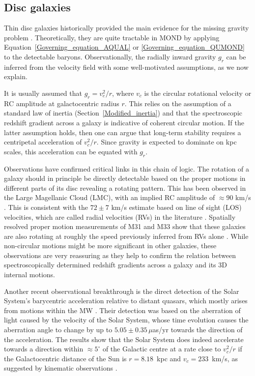 \documentclass[fleqn,usenatbib,useAMS,onecolumn]{mnras} %
\begin{document}
\subsection{Disc galaxies}
\label{Disc_galaxies}

Thin disc galaxies historically provided the main evidence for the missing gravity problem \citep[as reviewed in][]{Faber_1979}. Theoretically, they are quite tractable in MOND by applying Equation~\ref{Governing_equation_AQUAL} or \ref{Governing_equation_QUMOND} to the detectable baryons. Observationally, the radially inward gravity $g_r$ can be inferred from the velocity field with some well-motivated assumptions, as we now explain.

It is usually assumed that $g_r = v_c^2/r$, where $v_c$ is the circular rotational velocity or RC amplitude at galactocentric radius $r$. This relies on the assumption of a standard law of inertia (Section~\ref{Modified_inertia}) and that the spectroscopic redshift gradient across a galaxy is indicative of coherent circular motion. If the latter assumption holds, then one can argue that long-term stability requires a centripetal acceleration of $v_c^2/r$. Since gravity is expected to dominate on kpc scales, this acceleration can be equated with $g_r$.

Observations have confirmed critical links in this chain of logic. The rotation of a galaxy should in principle be directly detectable based on the proper motions in different parts of its disc revealing a rotating pattern. This has been observed in the Large Magellanic Cloud (LMC), with an implied RC amplitude of $\approx 90$ km/s \citep{Van_der_Marel_2014, Van_der_Marel_2016, Vasiliev_2018}. This is consistent with the $72 \pm 7$ km/s estimate based on line of sight (LOS) velocities, which are called radial velocities (RVs) in the literature \citep{Alves_2000}. Spatially resolved proper motion measurements of M31 and M33 show that these galaxies are also rotating at roughly the speed previously inferred from RVs alone \citep{Van_der_Marel_2019}. While non-circular motions might be more significant in other galaxies, these observations are very reassuring as they help to confirm the relation between spectroscopically determined redshift gradients across a galaxy and its 3D internal motions.

Another recent observational breakthrough is the direct detection of the Solar System's barycentric acceleration relative to distant quasars, which mostly arises from motions within the MW \citep{Klioner_2021}. Their detection was based on the aberration of light caused by the velocity of the Solar System, whose time evolution causes the aberration angle to change by up to $5.05 \pm 0.35 \, \mu$as/yr towards the direction of the acceleration. The results show that the Solar System does indeed accelerate towards a direction within $\approx 5^\circ$ of the Galactic centre at a rate close to $v_c^2/r$ if the Galactocentric distance of the Sun is $r = 8.18$~kpc \citep{Gravity_2019} and $v_c = 233$~km/s, as suggested by kinematic observations \citep[e.g.][]{McMillan_2017, McGaugh_2018}.
\end{document}
